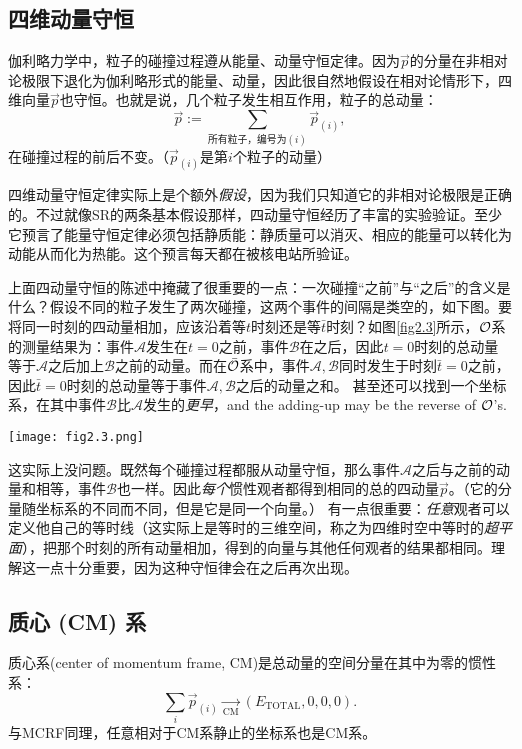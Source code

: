 \subsection*{四维动量守恒}
伽利略力学中，粒子的碰撞过程遵从能量、动量守恒定律。因为$\vec{p}$的分量在非相对论极限下退化为伽利略形式的能量、动量，因此很自然地假设在相对论情形下，四维向量$\vec{p}$也守恒。也就是说，几个粒子发生相互作用，粒子的总动量：
\begin{equation}
    \vec{p} := \sum_{\text{所有粒子，编号为}(i)} \vec{p}_{(i)},
\label{equ2.22}
\end{equation}
在碰撞过程的前后不变。（$\vec{p}_{(i)}$是第$i$个粒子的动量）

四维动量守恒定律实际上是个额外\textit{假设}，因为我们只知道它的非相对论极限是正确的。不过就像SR的两条基本假设那样，四动量守恒经历了丰富的实验验证。至少它预言了能量守恒定律必须包括静质能：静质量可以消灭、相应的能量可以转化为动能从而化为热能。这个预言每天都在被核电站所验证。

上面四动量守恒的陈述中掩藏了很重要的一点：一次碰撞“之前”与“之后”的含义是什么？假设不同的粒子发生了两次碰撞，这两个事件的间隔是类空的，如下图。要将同一时刻的四动量相加，应该沿着等$t$时刻还是等$\bar{t}$时刻？如图\ref{fig2.3}所示，$\mathcal{O}$系的测量结果为：事件$\mathscr{A}$发生在$t = 0$之前，事件$\mathscr{B}$在之后，因此$t = 0$时刻的总动量等于$\mathscr{A}$之后加上$\mathscr{B}$之前的动量。而在$\bar{\mathcal{O}}$系中，事件$\mathscr{A}, \mathscr{B}$同时发生于时刻$\bar{t} = 0$之前，因此$\bar{t} = 0$时刻的总动量等于事件$\mathscr{A}, \mathscr{B}$之后的动量之和。 甚至还可以找到一个坐标系，在其中事件$\mathscr{B}$比$\mathscr{A}$发生的\textit{更早}，and the adding-up may be the reverse of $\mathcal{O}$'s. 

{
    \centering
    \texttt{[image: fig2.3.png]}
    \label{fig2.3}
}

这实际上没问题。既然每个碰撞过程都服从动量守恒，那么事件$\mathscr{A}$之后与之前的动量和相等，事件$\mathscr{B}$也一样。因此\textit{每个}惯性观者都得到相同的总的四动量$\vec{p}$。（它的分量随坐标系的不同而不同，但是它是同一个向量。） 有一点很重要：\textit{任意}观者可以定义他自己的等时线（这实际上是等时的三维空间，称之为四维时空中等时的\textit{超平面}），把那个时刻的所有动量相加，得到的向量与其他任何观者的结果都相同。理解这一点十分重要，因为这种守恒律会在之后再次出现。

\subsection*{质心 (CM) 系}
质心系(center of momentum frame, CM)是总动量的空间分量在其中为零的惯性系：
\begin{equation}
    \sum_i \vec{p}_{(i)} \xrightarrow[\text{CM}]{ } (E_{\text{TOTAL}}, 0, 0, 0).
\label{equ2.23}
\end{equation}
与MCRF同理，任意相对于CM系静止的坐标系也是CM系。

